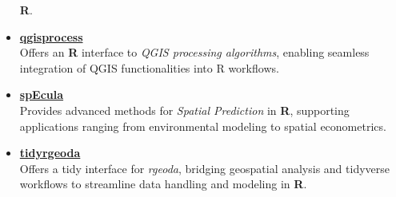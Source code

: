 \documentclass[11pt,a4paper,]{moderncv}
\begin{document}
\begin{itemize}
  \textbf{R}.
\item
  \textbf{\href{https://github.com/r-spatial/qgisprocess}{qgisprocess}}\\
  Offers an \textbf{R} interface to \emph{QGIS processing algorithms},
  enabling seamless integration of QGIS functionalities into R
  workflows.
\item
  \textbf{\href{https://github.com/SpatLyu/spEcula}{spEcula}}\\
  Provides advanced methods for \emph{Spatial Prediction} in \textbf{R},
  supporting applications ranging from environmental modeling to spatial
  econometrics.
\item
  \textbf{\href{https://github.com/SpatLyu/tidyrgeoda}{tidyrgeoda}}\\
  Offers a tidy interface for \emph{rgeoda}, bridging geospatial
  analysis and tidyverse workflows to streamline data handling and
  modeling in \textbf{R}.
\end{itemize}
\end{document}
